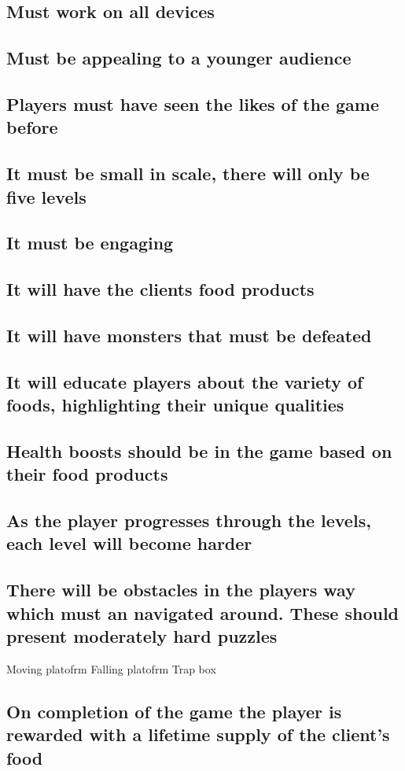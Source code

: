 \documentclass{article}
\begin{document}
\subsection{ Must work on all devices }
\subsection{ Must be appealing to a younger audience }
\subsection{ Players must have seen the likes of the game before }
\subsection{ It must be small in scale, there will only be five levels }
\subsection{ It must be engaging }
\subsection{ It will have the clients food products }
\subsection{ It will have monsters that must be defeated }
\subsection{ It will educate players about the variety of foods, highlighting their unique qualities }
\subsection{ Health boosts should be in the game based on their food products }
\subsection{ As the player progresses through the levels, each level will become harder }
\subsection{ There will be obstacles in the players way which must an navigated around. These should present moderately hard puzzles }
Moving platofrm
Falling platofrm
Trap box

\subsection{ On completion of the game the player is rewarded with a lifetime supply of the client's food }
\end{document}
